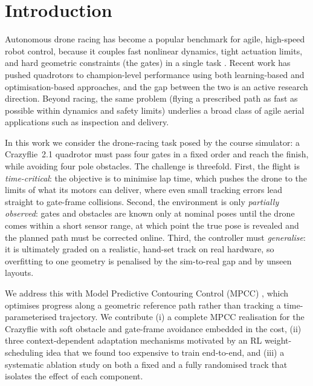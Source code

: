 \documentclass[conference]{IEEEtran}
\begin{document}
\section{Introduction}
Autonomous drone racing has become a popular benchmark for agile, high-speed
robot control, because it couples fast nonlinear dynamics, tight actuation
limits, and hard geometric constraints (the gates) in a single task
\cite{hanover2024survey}. Recent work has pushed quadrotors to champion-level
performance using both learning-based \cite{kaufmann2023champion} and
optimisation-based \cite{foehn2021timeoptimal,romero2022mpcc} approaches, and the
gap between the two is an active research direction. Beyond racing, the same
problem (flying a prescribed path as fast as possible within dynamics and safety
limits) underlies a broad class of agile aerial applications such as inspection
and delivery.

In this work we consider the drone-racing task posed by the course simulator: a
Crazyflie~2.1 quadrotor must pass four gates in a fixed order and reach the
finish, while avoiding four pole obstacles. The challenge is threefold. First,
the flight is \emph{time-critical}: the objective is to minimise lap time, which
pushes the drone to the limits of what its motors can deliver, where even small
tracking errors lead straight to gate-frame collisions. Second, the environment is only
\emph{partially observed}: gates and obstacles are known only at nominal poses
until the drone comes within a short sensor range, at which point the true pose
is revealed and the planned path must be corrected online. Third, the controller
must \emph{generalise}: it is ultimately graded on a realistic, hand-set track on
real hardware, so overfitting to one geometry is penalised by the sim-to-real
gap and by unseen layouts.

We address this with Model Predictive Contouring Control (MPCC)
\cite{lam2010mpcc,liniger2015racing,romero2022mpcc,krinner2024mpccpp}, which optimises progress
along a geometric reference path rather than tracking a time-parameterised
trajectory. We contribute (i) a complete MPCC realisation for the Crazyflie with
soft obstacle and gate-frame avoidance embedded in the cost, (ii) three
context-dependent adaptation mechanisms motivated by an RL weight-scheduling idea
that we found too expensive to train end-to-end, and (iii) a systematic ablation
study on both a fixed and a fully randomised track that isolates the effect of
each component.
\end{document}

